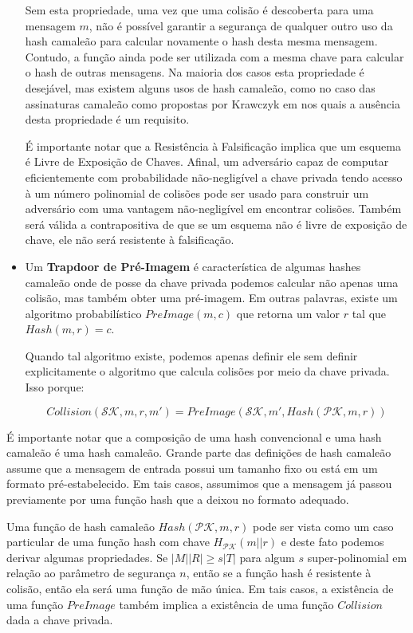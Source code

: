 \documentclass[a4paper]{article}
\begin{document}
\begin{itemize}
      Sem esta propriedade, uma vez que uma colisão é descoberta para uma
      mensagem $m$, não é possível garantir a segurança de qualquer outro
      uso da hash camaleão para calcular novamente o hash desta mesma
      mensagem. Contudo, a função ainda pode ser utilizada com a mesma
      chave para calcular o hash de outras mensagens. Na maioria dos casos
      esta propriedade é desejável, mas existem alguns usos de hash
      camaleão, como no caso das assinaturas camaleão como propostas por
      Krawczyk em \cite{krawczyk} nos quais a ausência desta propriedade é
      um requisito.
    
      É importante notar que a Resistência à Falsificação implica que um
      esquema é Livre de Exposição de Chaves. Afinal, um adversário capaz
      de computar eficientemente com probabilidade não-negligível a chave
      privada tendo acesso à um número polinomial de colisões pode ser
      usado para construir um adversário com uma vantagem não-negligível
      em encontrar colisões. Também será válida a contrapositiva de que se
      um esquema não é livre de exposição de chave, ele não será
      resistente à falsificação.
    \item Um \textbf{Trapdoor de Pré-Imagem} é característica de algumas
      hashes camaleão onde de posse da chave privada podemos calcular não
      apenas uma colisão, mas também obter uma pré-imagem. Em outras
      palavras, existe um algoritmo probabilístico $PreImage(m, c)$ que
      retorna um valor $r$ tal que $Hash(m, r)=c$.
    
      Quando tal algoritmo existe, podemos apenas definir ele sem definir
      explicitamente o algoritmo que calcula colisões por meio da chave
      privada. Isso porque:
    
      $$Collision(\mathcal{SK}, m, r, m') = PreImage(\mathcal{SK}, m',
      Hash(\mathcal{PK}, m, r))$$
    \end{itemize}
    
      
    É importante notar que a composição de uma hash convencional e uma
    hash camaleão é uma hash camaleão. Grande parte das definições de hash
    camaleão assume que a mensagem de entrada possui um tamanho fixo ou
    está em um formato pré-estabelecido. Em tais casos, assumimos que a
    mensagem já passou previamente por uma função hash que a deixou no
    formato adequado.
    
    Uma função de hash camaleão $Hash(\mathcal{PK}, m, r)$ pode ser vista
    como um caso particular de uma função hash com chave
    $H_{\mathcal{PK}}(m||r)$ e deste fato podemos derivar algumas
    propriedades. Se $|M||R| \geq s |T|$ para algum $s$ super-polinomial
    em relação ao parâmetro de segurança $n$, então se a função hash é
    resistente à colisão, então ela será uma função de mão única. Em tais
    casos, a existência de uma função $PreImage$ também implica a
    existência de uma função $Collision$ dada a chave privada.
    
\end{document}
